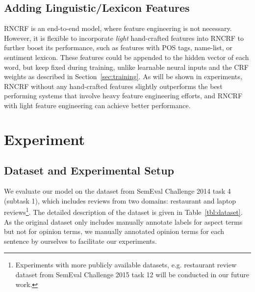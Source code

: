 \documentclass[11pt,letterpaper]{article}
\begin{document}
\subsection{Adding Linguistic/Lexicon Features}\label{sec:feature}
RNCRF is an end-to-end model, where feature engineering is not necessary. However, it is flexible to incorporate \textit{light} hand-crafted features into RNCRF to further boost its performance, such as features with POS tags, name-list, or sentiment lexicon. These features could be appended to the hidden vector of each word, but keep fixed during training, unlike learnable neural inputs and the CRF weights as described in Section~\ref{sec:training}. As will be shown in experiments, RNCRF without any hand-crafted features slightly outperforms the best performing systems that involve heavy feature engineering efforts, and RNCRF with light feature engineering can achieve better performance.

\section{Experiment}

\subsection{Dataset and Experimental Setup}
We evaluate our model on the dataset from SemEval Challenge 2014 task 4 (subtask 1), which includes reviews from two domains: restaurant and laptop reviews\footnote{Experiments with more publicly available datasets, e.g. restaurant review dataset from SemEval Challenge 2015 task 12 will be conducted in our future work.}. The detailed description of the dataset is given in Table~\ref{tbl:dataset}. As the original dataset only includes manually annotate labels for aspect terms but not for opinion terms, we manually annotated opinion terms for each sentence by ourselves to facilitate our experiments.
\end{document}
